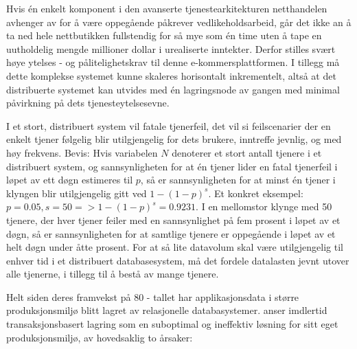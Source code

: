 Hvis én enkelt komponent i den avanserte tjenestearkitekturen netthandelen avhenger av for å være oppegående påkrever vedlikeholdsarbeid, går det ikke an å ta ned hele nettbutikken fullstendig for så mye som én time uten å tape en uutholdelig mengde millioner dollar i urealiserte inntekter. Derfor stilles svært høye ytelses - og pålitelighetskrav til denne e-kommersplattformen. I tillegg må dette komplekse systemet kunne skaleres horisontalt inkrementelt, altså at det distribuerte systemet kan utvides med én lagringsnode av gangen med minimal påvirkning på dets tjenesteytelsesevne.

I et stort, distribuert system vil fatale tjenerfeil, det vil si feilscenarier der en enkelt tjener følgelig blir utilgjengelig for dets brukere, inntreffe jevnlig, og med høy frekvens. Bevis: Hvis variabelen \(N\) denoterer et stort antall tjenere i et distribuert system, og sannsynligheten for at én tjener lider en fatal tjenerfeil i løpet av ett døgn estimeres til \(p\), så er sannsynligheten for at minst én tjener i klyngen blir utilgjengelig gitt ved \(1-(1-p)^s\). Et konkret eksempel: \(p=0.05, s=50 => 1-(1-p)^s=0.9231\). I en mellomstor klynge med 50 tjenere, der hver tjener feiler med en sannsynlighet på fem prosent i løpet av et døgn, så er sannsynligheten for at samtlige tjenere er oppegående i løpet av et helt døgn under åtte prosent. For at så lite datavolum skal være utilgjengelig til enhver tid i et distribuert databasesystem, må det fordele datalasten jevnt utover alle tjenerne, i tillegg til å bestå av mange tjenere.

Helt siden deres framvekst på 80 - tallet har applikasjonsdata i større produksjonsmiljø blitt lagret av relasjonelle databasystemer. \cite{decandia2007} anser imdlertid transaksjonsbasert lagring som en suboptimal og ineffektiv løsning for sitt eget produksjonsmiljø, av hovedsaklig to årsaker:

